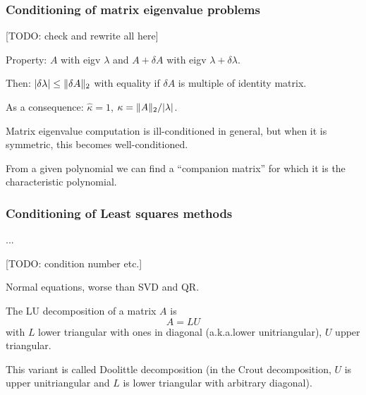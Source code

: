 \documentclass[
  12pt,
  paper=a4,
]{scrartcl} %
\begin{document}
\subsubsection*{Conditioning of matrix eigenvalue problems}
[TODO: check and rewrite all here]

Property: $A$ with eigv $\lambda$ and $A+\delta A$ with eigv $\lambda + \delta \lambda$.

Then: $|\delta \lambda| \le \|\delta A\|_2$ with equality if $\delta A$ is multiple of identity matrix.

As a consequence: $\hat{\kappa} =1$, $\kappa= \|A\|_2/|\lambda|$.

Matrix eigenvalue computation is ill-conditioned in general, but when it is symmetric, this becomes well-conditioned.

From a given polynomial we can find a ``companion matrix'' for which it is the characteristic polynomial.


\subsubsection{Conditioning of Least squares methods}

...

[TODO: condition number etc.]

Normal equations, worse than SVD and QR.




\newpage

The LU decomposition of a matrix $A$ is
\[A = LU\]
with $L$ lower triangular with ones in diagonal (a.k.a.\@ lower unitriangular), $U$ upper triangular.

This variant is called Doolittle decomposition (in the Crout decomposition, $U$ is upper unitriangular and $L$ is lower triangular with arbitrary diagonal).
\end{document}
